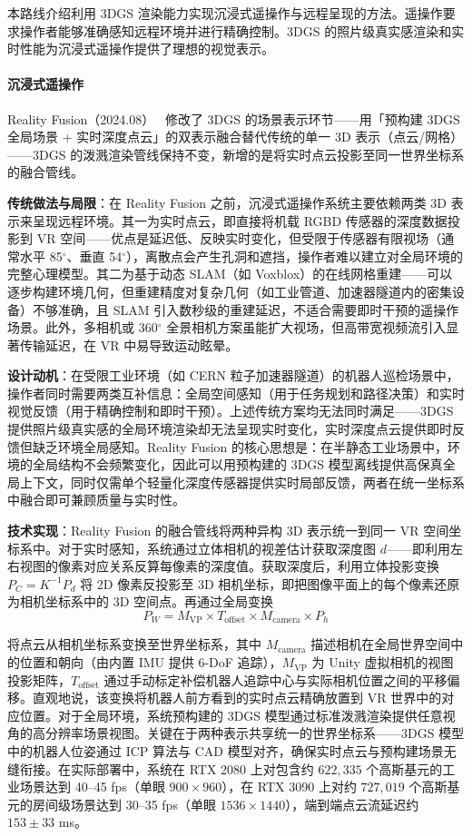 本路线介绍利用 3DGS 渲染能力实现沉浸式遥操作与远程呈现的方法。遥操作要求操作者能够准确感知远程环境并进行精确控制。3DGS 的照片级真实感渲染和实时性能为沉浸式遥操作提供了理想的视觉表示。

\paragraph{沉浸式遥操作}

Reality Fusion（2024.08）~\cite{2408_01225} 修改了 3DGS 的场景表示环节——用「预构建 3DGS 全局场景 $+$ 实时深度点云」的双表示融合替代传统的单一 3D 表示（点云/网格）——3DGS 的泼溅渲染管线保持不变，新增的是将实时点云投影至同一世界坐标系的融合管线。

\textbf{传统做法与局限}：在 Reality Fusion 之前，沉浸式遥操作系统主要依赖两类 3D 表示来呈现远程环境。其一为实时点云，即直接将机载 RGBD 传感器的深度数据投影到 VR 空间——优点是延迟低、反映实时变化，但受限于传感器有限视场（通常水平 85$^\circ$、垂直 54$^\circ$），离散点会产生孔洞和遮挡，操作者难以建立对全局环境的完整心理模型。其二为基于动态 SLAM（如 Voxblox）的在线网格重建——可以逐步构建环境几何，但重建精度对复杂几何（如工业管道、加速器隧道内的密集设备）不够准确，且 SLAM 引入数秒级的重建延迟，不适合需要即时干预的遥操作场景。此外，多相机或 360$^\circ$ 全景相机方案虽能扩大视场，但高带宽视频流引入显著传输延迟，在 VR 中易导致运动眩晕。

\textbf{设计动机}：在受限工业环境（如 CERN 粒子加速器隧道）的机器人巡检场景中，操作者同时需要两类互补信息：全局空间感知（用于任务规划和路径决策）和实时视觉反馈（用于精确控制和即时干预）。上述传统方案均无法同时满足——3DGS 提供照片级真实感的全局环境渲染却无法呈现实时变化，实时深度点云提供即时反馈但缺乏环境全局感知。Reality Fusion 的核心思想是：在半静态工业场景中，环境的全局结构不会频繁变化，因此可以用预构建的 3DGS 模型离线提供高保真全局上下文，同时仅需单个轻量化深度传感器提供实时局部反馈，两者在统一坐标系中融合即可兼顾质量与实时性。

\textbf{技术实现}：Reality Fusion 的融合管线将两种异构 3D 表示统一到同一 VR 空间坐标系中。对于实时感知，系统通过立体相机的视差估计获取深度图 $d$——即利用左右视图的像素对应关系反算每像素的深度值。获取深度后，利用立体投影变换 $P_C = K^{-1} P_d$ 将 2D 像素反投影至 3D 相机坐标，即把图像平面上的每个像素还原为相机坐标系中的 3D 空间点。再通过全局变换
\begin{equation}
    P_W = M_\text{VP} \times T_\text{offset} \times M_\text{camera} \times P_h
\end{equation}

将点云从相机坐标系变换至世界坐标系，其中 $M_\text{camera}$ 描述相机在全局世界空间中的位置和朝向（由内置 IMU 提供 6-DoF 追踪），$M_\text{VP}$ 为 Unity 虚拟相机的视图投影矩阵，$T_\text{offset}$ 通过手动标定补偿机器人追踪中心与实际相机位置之间的平移偏移。直观地说，该变换将机器人前方看到的实时点云精确放置到 VR 世界中的对应位置。对于全局环境，系统预构建的 3DGS 模型通过标准泼溅渲染提供任意视角的高分辨率场景视图。关键在于两种表示共享统一的世界坐标系——3DGS 模型中的机器人位姿通过 ICP 算法与 CAD 模型对齐，确保实时点云与预构建场景无缝衔接。在实际部署中，系统在 RTX 2080 上对包含约 $622{,}335$ 个高斯基元的工业场景达到 40--45 fps（单眼 $900 \times 960$），在 RTX 3090 上对约 $727{,}019$ 个高斯基元的房间级场景达到 30--35 fps（单眼 $1536 \times 1440$），端到端点云流延迟约 $153 \pm 33$ ms。

